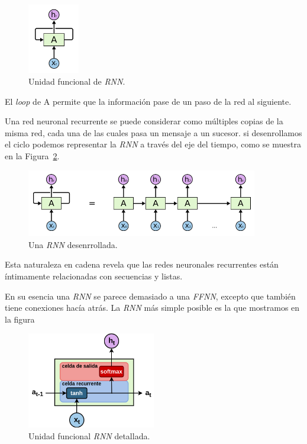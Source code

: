 \documentclass[a4paper,12pt]{article}
\begin{document}
\begin{figure}[H]
	\begin{center}				
	\includegraphics[width=0.2\textwidth]{tesis_27.png}
  	\caption{Unidad funcional de \textit{RNN}.}
  	\label{fig:rnnunit}
  	\end{center}
\end{figure}

El \textit{loop} de A permite que la información pase de un paso de la red al siguiente.

Una red neuronal recurrente se puede considerar como múltiples copias de la misma red, cada una de las cuales pasa un mensaje a un sucesor. si desenrollamos el ciclo podemos representar la \textit{RNN} a través del eje del tiempo, como se muestra en la Figura~\ref{fig:rnnunrolled}.

\begin{figure}[H]
	\begin{center}
	\includegraphics[width=0.9\textwidth]{tesis_28.png}
  	\caption{Una \textit{RNN} desenrrollada.}
  	\label{fig:rnnunrolled}
  	\end{center}
\end{figure}

Esta naturaleza en cadena revela que las redes neuronales recurrentes están íntimamente relacionadas con secuencias y listas.

En su esencia una \textit{RNN} se parece demasiado a una \textit{FFNN}, excepto que también tiene conexiones hacía atrás.
La \textit{RNN} más simple posible es la que mostramos en la figura 


\begin{figure}[H]
	\begin{center}				
	\includegraphics[width=0.5\textwidth]{rnnunitv2.png}
  	\caption{Unidad funcional \textit{RNN} detallada.}
  	\label{fig:rnnunitv2}
  	\end{center}
\end{figure}
\end{document}

